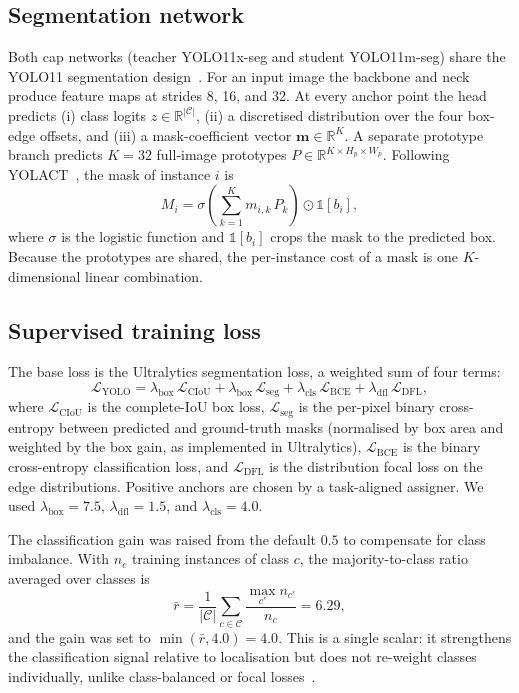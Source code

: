\subsection{Segmentation network}
\label{sec:seg-impl}
Both cap networks (teacher YOLO11x-seg and student YOLO11m-seg) share the YOLO11 segmentation design~\cite{jocher2024}. For an input image the backbone and neck produce feature maps at strides 8, 16, and 32. At every anchor point the head predicts (i) class logits $z\in\mathbb{R}^{|\mathcal{C}|}$, (ii) a discretised distribution over the four box-edge offsets, and (iii) a mask-coefficient vector $\mathbf{m}\in\mathbb{R}^{K}$. A separate prototype branch predicts $K=32$ full-image prototypes $P\in\mathbb{R}^{K\times H_p\times W_p}$. Following YOLACT~\cite{bolya2019}, the mask of instance $i$ is
\begin{equation}
    M_i = \sigma\!\left(\sum_{k=1}^{K} m_{i,k}\,P_k\right)\odot \mathbb{1}[b_i],
    \label{eq:mask}
\end{equation}
where $\sigma$ is the logistic function and $\mathbb{1}[b_i]$ crops the mask to the predicted box. Because the prototypes are shared, the per-instance cost of a mask is one $K$-dimensional linear combination.

\subsection{Supervised training loss}
The base loss is the Ultralytics segmentation loss, a weighted sum of four terms:
\begin{equation}
    \mathcal{L}_{\text{YOLO}} = \lambda_{\text{box}}\,\mathcal{L}_{\text{CIoU}} + \lambda_{\text{box}}\,\mathcal{L}_{\text{seg}} + \lambda_{\text{cls}}\,\mathcal{L}_{\text{BCE}} + \lambda_{\text{dfl}}\,\mathcal{L}_{\text{DFL}},
    \label{eq:yololoss}
\end{equation}
where $\mathcal{L}_{\text{CIoU}}$ is the complete-IoU box loss, $\mathcal{L}_{\text{seg}}$ is the per-pixel binary cross-entropy between predicted and ground-truth masks (normalised by box area and weighted by the box gain, as implemented in Ultralytics), $\mathcal{L}_{\text{BCE}}$ is the binary cross-entropy classification loss, and $\mathcal{L}_{\text{DFL}}$ is the distribution focal loss on the edge distributions. Positive anchors are chosen by a task-aligned assigner. We used $\lambda_{\text{box}}=7.5$, $\lambda_{\text{dfl}}=1.5$, and $\lambda_{\text{cls}}=4.0$.

The classification gain was raised from the default $0.5$ to compensate for class imbalance. With $n_c$ training instances of class $c$, the majority-to-class ratio averaged over classes is
\begin{equation}
    \bar{r} = \frac{1}{|\mathcal{C}|}\sum_{c\in\mathcal{C}}\frac{\max_{c'} n_{c'}}{n_c} = 6.29,
    \label{eq:imb}
\end{equation}
and the gain was set to $\min(\bar r, 4.0)=4.0$. This is a single scalar: it strengthens the classification signal relative to localisation but does not re-weight classes individually, unlike class-balanced or focal losses~\cite{cui2019,lin2017focal}.

